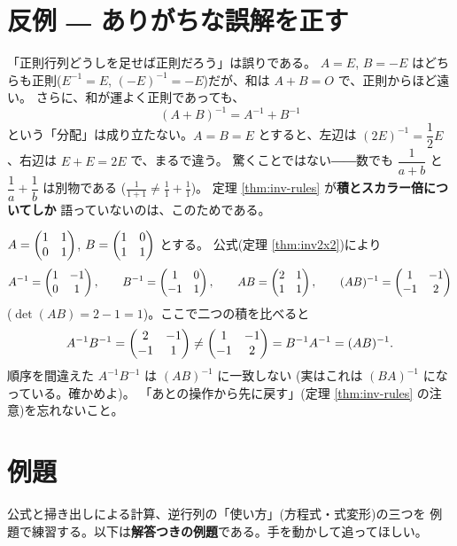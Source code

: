 \section{反例 ― ありがちな誤解を正す}

\begin{hanrei}[和は正則性を保たない]\label{hanrei:invsum}
「正則行列どうしを足せば正則だろう」は誤りである。
$A = E$, $B = -E$ はどちらも正則($E^{-1} = E$,
$(-E)^{-1} = -E$)だが、和は $A + B = O$ で、正則からほど遠い。
さらに、和が運よく正則であっても、
\[
(A + B)^{-1} = A^{-1} + B^{-1}
\]
という「分配」は成り立たない。$A = B = E$ とすると、左辺は
$(2E)^{-1} = \dfrac{1}{2}E$、右辺は $E + E = 2E$ で、まるで違う。
驚くことではない――数でも $\dfrac{1}{a + b}$ と
$\dfrac{1}{a} + \dfrac{1}{b}$ は別物である
($\frac{1}{1+1} \neq \frac{1}{1} + \frac{1}{1}$)。
定理 \ref{thm:inv-rules} が\textbf{積とスカラー倍についてしか}
語っていないのは、このためである。
\end{hanrei}

\begin{hanrei}[$(AB)^{-1} = A^{-1}B^{-1}$ は誤り]\label{hanrei:invorder}
$A = \begin{pmatrix}1 & 1 \\ 0 & 1\end{pmatrix}$, $B = \begin{pmatrix}1 & 0 \\ 1 & 1\end{pmatrix}$ とする。
公式(定理 \ref{thm:inv2x2})により
\[
A^{-1} = \begin{pmatrix}1 & -1 \\ 0 & 1\end{pmatrix}, \qquad
B^{-1} = \begin{pmatrix}1 & 0 \\ -1 & 1\end{pmatrix}, \qquad
AB = \begin{pmatrix}2 & 1 \\ 1 & 1\end{pmatrix}, \qquad
(AB)^{-1} = \begin{pmatrix}1 & -1 \\ -1 & 2\end{pmatrix}
\]
($\det(AB) = 2 - 1 = 1$)。ここで二つの積を比べると
\[
A^{-1}B^{-1} = \begin{pmatrix}2 & -1 \\ -1 & 1\end{pmatrix} \neq \begin{pmatrix}1 & -1 \\ -1 & 2\end{pmatrix}
= B^{-1}A^{-1} = (AB)^{-1}.
\]
順序を間違えた $A^{-1}B^{-1}$ は $(AB)^{-1}$ に一致しない
(実はこれは $(BA)^{-1}$ になっている。確かめよ)。
「あとの操作から先に戻す」(定理 \ref{thm:inv-rules} の注意)を忘れないこと。
\end{hanrei}

\section{例題}

公式と掃き出しによる計算、逆行列の「使い方」(方程式・式変形)の三つを
例題で練習する。以下は\textbf{解答つきの例題}である。手を動かして追ってほしい。

